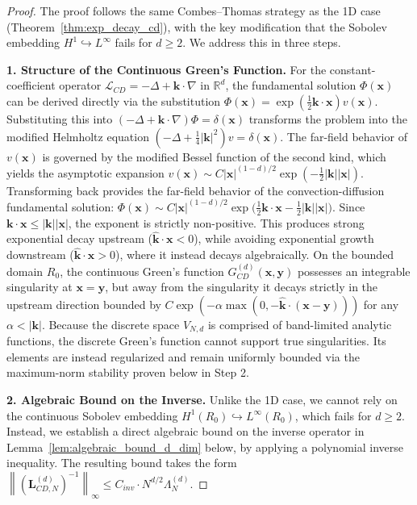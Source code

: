 \documentclass[pdflatex,sn-mathphys-num]{sn-jnl}%
\theoremstyle{thmstyleone}%
\newcommand{\norm}[1]{\left\lVert#1\right\rVert}
\newcommand{\mat}[1]{\mathbf{#1}}
\begin{document}
\begin{proof}
The proof follows the same Combes--Thomas strategy as the 1D case (Theorem~\ref{thm:exp_decay_cd}), with the key modification that the Sobolev embedding $H^1 \hookrightarrow L^\infty$ fails for $d \ge 2$. We address this in three steps.

\noindent\textbf{1. Structure of the Continuous Green's Function.}
For the constant-coefficient operator $\mathcal{L}_{CD} = -\Delta + \mathbf{k} \cdot \nabla$ in $\mathbb{R}^d$, the fundamental solution $\Phi(\mathbf{x})$ can be derived directly via the substitution $\Phi(\mathbf{x}) = \exp(\frac{1}{2}\mathbf{k} \cdot \mathbf{x}) v(\mathbf{x})$. Substituting this into $(-\Delta + \mathbf{k} \cdot \nabla)\Phi = \delta(\mathbf{x})$ transforms the problem into the modified Helmholtz equation $(-\Delta + \frac{1}{4}|\mathbf{k}|^2)v = \delta(\mathbf{x})$. The far-field behavior of $v(\mathbf{x})$ is governed by the modified Bessel function of the second kind, which yields the asymptotic expansion $v(\mathbf{x}) \sim C |\mathbf{x}|^{(1-d)/2} \exp(-\frac{1}{2}|\mathbf{k}||\mathbf{x}|)$. Transforming back provides the far-field behavior of the convection-diffusion fundamental solution: $\Phi(\mathbf{x}) \sim C |\mathbf{x}|^{(1-d)/2} \exp\bigl(\tfrac{1}{2}\mathbf{k} \cdot \mathbf{x} - \tfrac{1}{2}|\mathbf{k}||\mathbf{x}|\bigr)$. Since $\mathbf{k} \cdot \mathbf{x} \le |\mathbf{k}||\mathbf{x}|$, the exponent is strictly non-positive. This produces strong exponential decay upstream ($\hat{\mathbf{k}} \cdot \mathbf{x} < 0$), while avoiding exponential growth downstream ($\hat{\mathbf{k}} \cdot \mathbf{x} > 0$), where it instead decays algebraically. On the bounded domain $R_0$, the continuous Green's function $G_{CD}^{(d)}(\mathbf{x}, \mathbf{y})$ possesses an integrable singularity at $\mathbf{x}=\mathbf{y}$, but away from the singularity it decays strictly in the upstream direction bounded by $C \exp(-\alpha \max(0, -\hat{\mathbf{k}} \cdot (\mathbf{x} - \mathbf{y})))$ for any $\alpha < |\mathbf{k}|$. Because the discrete space $V_{N,d}$ is comprised of band-limited analytic functions, the discrete Green's function cannot support true singularities. Its elements are instead regularized and remain uniformly bounded via the maximum-norm stability proven below in Step 2.

\noindent\textbf{2. Algebraic Bound on the Inverse.}
Unlike the 1D case, we cannot rely on the continuous Sobolev embedding $H^1(R_0) \hookrightarrow L^\infty(R_0)$, which fails for $d \ge 2$. Instead, we establish a direct algebraic bound on the inverse operator in Lemma~\ref{lem:algebraic_bound_d_dim} below, by applying a polynomial inverse inequality. The resulting bound takes the form $\norm{(\mat{L}_{CD,N}^{(d)})^{-1}}_\infty \le C_{inv} \cdot N^{d/2} \Lambda_N^{(d)}$.


\end{proof}
\end{document}
